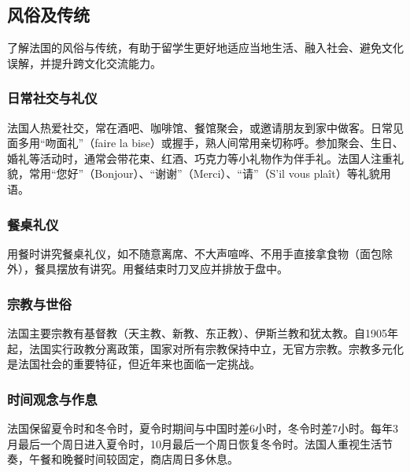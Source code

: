 \subsection{风俗及传统}

了解法国的风俗与传统，有助于留学生更好地适应当地生活、融入社会、避免文化误解，并提升跨文化交流能力。

\subsubsection{日常社交与礼仪}
法国人热爱社交，常在酒吧、咖啡馆、餐馆聚会，或邀请朋友到家中做客。日常见面多用“吻面礼”（faire la bise）或握手，熟人间常用亲切称呼。参加聚会、生日、婚礼等活动时，通常会带花束、红酒、巧克力等小礼物作为伴手礼。法国人注重礼貌，常用“您好”（Bonjour）、“谢谢”（Merci）、“请”（S'il vous plaît）等礼貌用语。

\subsubsection{餐桌礼仪}
用餐时讲究餐桌礼仪，如不随意离席、不大声喧哗、不用手直接拿食物（面包除外），餐具摆放有讲究。用餐结束时刀叉应并排放于盘中。

\subsubsection{宗教与世俗}
法国主要宗教有基督教（天主教、新教、东正教）、伊斯兰教和犹太教。自1905年起，法国实行政教分离政策，国家对所有宗教保持中立，无官方宗教。宗教多元化是法国社会的重要特征，但近年来也面临一定挑战。

\subsubsection{时间观念与作息}
法国保留夏令时和冬令时，夏令时期间与中国时差6小时，冬令时差7小时。每年3月最后一个周日进入夏令时，10月最后一个周日恢复冬令时。法国人重视生活节奏，午餐和晚餐时间较固定，商店周日多休息。


